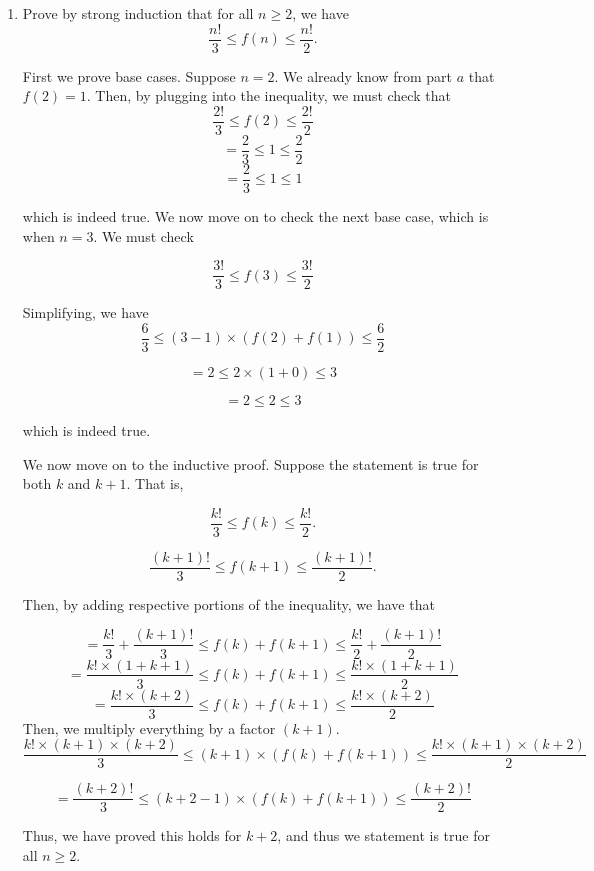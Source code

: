 \documentclass[11pt]{article}
\begin{document}
\begin{enumerate}
\begin{enumerate}
 \item Prove by strong induction that for all $n\geq 2$, we have
 $$\frac{n!}{3} \leq f(n) \leq \frac{n!}{2}.$$
 
 First we prove base cases. Suppose $n=2$. We already know from part $a$ that $f(2) = 1$. Then, by plugging into the inequality, we must check that 
$$
\frac{2!}{3} \leq f(2) \leq \frac{2!}{2}
$$
$$
 = \frac{2}{3} \leq 1 \leq \frac{2}{2}
$$
$$
 = \frac{2}{3} \leq 1 \leq 1
$$

which is indeed true. We now move on to check the next base case, which is when $n=3$. We must check

$$
\frac{3!}{3} \leq f(3) \leq \frac{3!}{2}
$$

Simplifying, we have 
$$
\frac{6}{3} \leq (3-1) \times \left( f(2) + f(1) \right) \leq \frac{6}{2}
$$

$$
= 2 \leq 2 \times (1 + 0) \leq 3
$$

$$
= 2 \leq 2 \leq 3
$$

which is indeed true. 

We now move on to the inductive proof. Suppose the statement is true for both $k$ and $k+1$. That is, 

 $$\frac{k!}{3} \leq f(k) \leq \frac{k!}{2}.$$
 
 $$\frac{(k+1)!}{3} \leq f(k+1) \leq \frac{(k+1)!}{2}.$$
 
 Then, by adding respective portions of the inequality, we have that 
 
 $$
= \frac{k!}{3} + \frac{(k+1)!}{3} \leq f(k) + f(k+1) \leq \frac{k!}{2} + \frac{(k+1)!}{2}
 $$
 $$
= \frac{k! \times (1 + k + 1)}{3} \leq f(k) + f(k+1) \leq \frac{k! \times (1 + k + 1)}{2}
 $$
 $$
= \frac{k! \times (k+2)}{3} \leq f(k) + f(k+1) \leq \frac{k! \times (k+2)}{2}
 $$
 Then, we multiply everything by a factor $(k+1)$. 
 $$
\frac{k! \times (k+1) \times (k+2)}{3} \leq (k+1) \times \left(f(k) + f(k+1)\right) \leq \frac{k! \times (k+1) \times (k+2)}{2}
 $$
 
$$
 = \frac{(k+2)!}{3} \leq (k + 2 - 1) \times  \left(f(k) + f(k+1)\right) \leq \frac{(k+2)!}{2}
$$

Thus, we have proved this holds for $k+2$, and thus we statement is true for all $n \geq 2$.
 
 
 
 \end{enumerate}

\end{enumerate}
\end{document}
